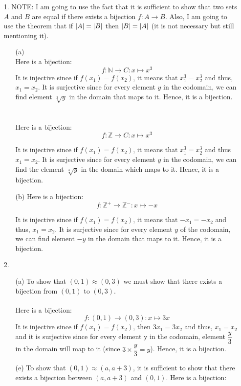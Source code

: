 \documentclass[12pt, a4paper]{article}
\newcommand{\nats}{\mathbb{N}}
\newcommand{\ints}{\mathbb{Z}}
\newcommand{\pints}{\mathbb{Z}^+}
\newcommand{\nints}{\mathbb{Z}^-}
\newcommand\und[1]{\underline{\smash{#1}}}
\DeclarePairedDelimiter\abs{\lvert}{\rvert}
\newcommand{\rarr}{\rightarrow}
\begin{document}
\begin{itemize}
{\Large Bookwork}
\item[1.]
NOTE: I am going to use the fact that it is sufficient to show that two sets $A$ and $B$ are equal
if there exists a bijection $f : A \rarr B$. Also, I am going to use the theorem that if $\abs{A} = \abs{B}$
then $\abs{B} = \abs{A}$ (it is not necessary but still mentioning it).
\begin{itemize}
\item[(a)]
\und{Showing that $C \approx \nats$.}\\
Here is a bijection:
$$f : \nats \rarr C : x \mapsto x^3$$
It is injective since if $f(x_1) = f(x_2)$, it means that $x_1^3 = x_2^3$ and thus, $x_1 = x_2$.
It is surjective since for every element $y$ in the codomain, we can find element $\sqrt[3]{y}$ in the domain that maps to it.
Hence, it is a bijection.
\\\\
\und{Showing that $C \approx \ints$.}\\
Here is a bijection:
$$f : \ints \rarr C : x \mapsto x^3$$

It is injective since if $f(x_1) = f(x_2)$, it means that $x_1^3 = x_2^3$ and thus $x_1 = x_2$.
It is surjective since for every element $y$ in the codomain, we can find the element $\sqrt[3]{y}$ in the domain which maps to it.
Hence, it is a bijection.
\item[(b)]
Here is a bijection:
$$f : \pints \rarr \nints : x \mapsto -x$$

It is injective since if $f(x_1) = f(x_2)$, it means that $-x_1 = -x_2$ and thus, $x_1 = x_2$.
It is surjective since for every element $y$ of the codomain, we can find element $-y$ in the domain that maps to it.
Hence, it is a bijection.
\end{itemize}

\item[]

\item[2.]
\begin{itemize}
\item[(a)]
To show that $(0,1) \approx (0, 3)$ we must show that there exists a bijection from $(0, 1)$ to $(0, 3)$.\\\\
Here is a bijection:
$$f : (0, 1) \rarr (0, 3) : x \mapsto 3x$$
It is injective since if $f(x_1) = f(x_2)$, then $3x_1 = 3x_2$ and thus, $x_1 = x_2$ and it is surjective since for
every element y in the codomain, element $\dfrac{y}{3}$ in the domain will map to it (since $3 \times \dfrac{y}{3} = y$).
Hence, it is a bijection.
\item[(e)]
To show that $(0, 1) \approx (a, a + 3)$, it is sufficient to show that there exists a bijection
between $(a, a + 3)$ and $(0, 1)$.
Here is a bijection:


\end{itemize}
\end{itemize}
\end{document}
